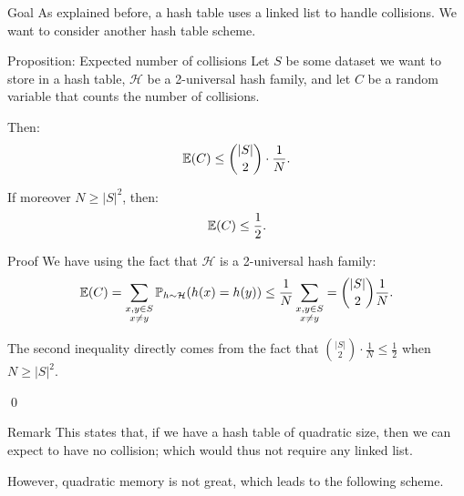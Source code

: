\documentclass[a4paper]{article}
\begin{document}
\begin{parag}{Goal}
    As explained before, a hash table uses a linked list to handle collisions. We want to consider another hash table scheme.
\end{parag}

\begin{parag}{Proposition: Expected number of collisions}
    Let $S$ be some dataset we want to store in a hash table, $\mathcal{H}$ be a 2-universal hash family, and let $C$ be a random variable that counts the number of collisions.

    Then: 
    \[\exval\left(C\right) \leq \binom{\left|S\right|}{2} \cdot \frac{1}{N}.\]

    If moreover $N \geq \left|S\right|^2$, then: 
    \[\exval\left(C\right) \leq \frac{1}{2}.\]

    \begin{subparag}{Proof}
        We have using the fact that $\mathcal{H}$ is a 2-universal hash family: 
        \[\exval\left(C\right) = \sum_{\substack{x, y \in S \\ x \neq y}} \prob_{h \followsdistr \mathcal{H}}\left(h\left(x\right) = h\left(y\right)\right) \leq \frac{1}{N} \sum_{\substack{x, y \in S \\ x \neq y}} = \binom{\left|S\right|}{2} \frac{1}{N}.\]

        The second inequality directly comes from the fact that $\binom{\left|S\right|}{2} \cdot \frac{1}{N} \leq \frac{1}{2}$ when $N \geq \left|S\right|^2$.

        \qed
    \end{subparag}

    \begin{subparag}{Remark}
        This states that, if we have a hash table of quadratic size, then we can expect to have no collision; which would thus not require any linked list.

        However, quadratic memory is not great, which leads to the following scheme.
    \end{subparag}
\end{parag}
\end{document}
